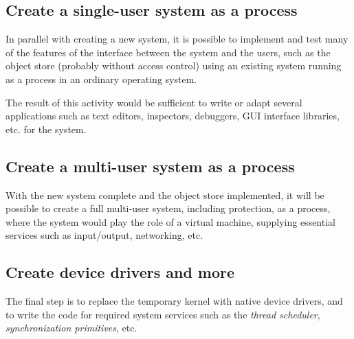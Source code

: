 \subsection{Create a single-user system as a \unix{} process}

In parallel with creating a new \cl{} system, it is possible to
implement and test many of the features of the interface between the
system and the users, such as the object store (probably without
access control) using an existing \cl{} system running as a process in
an ordinary operating system.  

The result of this activity would be sufficient to write or adapt
several applications such as text editors, inspectors, debuggers, GUI
interface libraries, etc. for the system.

\subsection{Create a multi-user system as a \unix{} process}

With the new \cl{} system complete and the object store implemented,
it will be possible to create a full multi-user system, including
protection, as a \unix{} process, where the \unix{} system would play
the role of a virtual machine, supplying essential services such as
input/output, networking, etc. 

\subsection{Create device drivers and more}

The final step is to replace the temporary \unix{} kernel with native
device drivers, and to write the code for required system services
such as the \emph{thread scheduler}, \emph{synchronization
  primitives}, etc.
